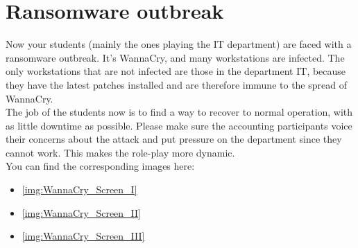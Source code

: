 \section{Ransomware outbreak}

Now your students (mainly the ones playing the IT department) are faced with a ransomware outbreak.
It's WannaCry, and many workstations are infected.
The only workstations that are not infected are those in the department IT, because they have the latest patches installed and are therefore immune to the spread of WannaCry.
\\

The job of the students now is to find a way to recover to normal operation, with as little downtime as possible.
Please make sure the accounting participants voice their concerns about the attack and put pressure on the department since they cannot work.
This makes the role-play more dynamic.
\\

You can find the corresponding images here:
\begin{itemize}
    \item \autoref{img:WannaCry_Screen_I}
    \item \autoref{img:WannaCry_Screen_II}
    \item \autoref{img:WannaCry_Screen_III}
\end{itemize}
